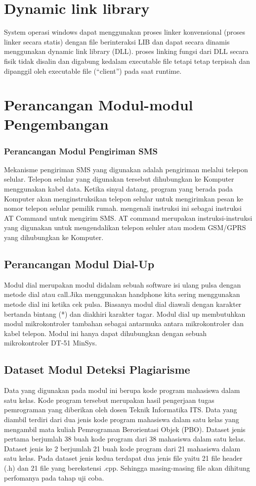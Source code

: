 \section{Dynamic link library}
System operasi windows dapat menggunakan proses linker konvensional (proses linker secara statis) dengan file berinteraksi LIB dan dapat secara dinamis menggunakan dynamic link library (DLL).
proses linking fungsi dari DLL secara fisik tidak disalin dan digabung kedalam executable file tetapi tetap terpisah dan dipanggil oleh executable file (“client”) pada saat runtime.

\section{Perancangan Modul-modul Pengembangan}
\subsubsection{Perancangan Modul Pengiriman SMS}
Mekanisme pengiriman SMS yang digunakan adalah pengiriman melalui telepon selular. Telepon selular yang digunakan tersebut dihubungkan ke Komputer menggunakan kabel data. Ketika sinyal datang, program yang berada pada Komputer akan menginstruksikan telepon selular untuk mengirimkan pesan ke nomor telepon selular pemilik rumah.
mengenali instruksi ini sebagai instruksi AT Command untuk mengirim SMS. AT command merupakan instruksi-instruksi yang digunakan untuk mengendalikan telepon seluler atau modem GSM/GPRS yang dihubungkan ke Komputer.
\subsection{Perancangan Modul Dial-Up}
Modul dial merupakan modul didalam sebuah software isi ulang pulsa dengan metode dial atau call.Jika menggunakan handphone kita sering menggunakan metode dial ini ketika cek pulsa. Biasanya modul dial diawali dengan karakter bertanda bintang (*) 
dan diakhiri karakter tagar. Modul dial up membutuhkan modul mikrokontroler tambahan 
sebagai antarmuka antara mikrokontroler dan kabel telepon. Modul ini hanya dapat dihubungkan dengan 
sebuah mikrokontroler DT-51 MinSys.
\subsection{Dataset Modul Deteksi Plagiarisme}
Data yang digunakan pada modul ini berupa kode program mahasiswa dalam satu kelas. Kode program tersebut merupakan hasil pengerjaan tugas pemrograman yang diberikan oleh dosen Teknik Informatika ITS. Data yang diambil terdiri dari dua jenis kode program mahasiswa dalam satu kelas yang mengambil mata kuliah Pemrograman Berorientasi Objek (PBO). Dataset jenis pertama berjumlah 38 buah kode program dari 38 mahasiswa dalam satu kelas. Dataset jenis ke 2 berjumlah 21 buah kode program dari 21 mahasiswa dalam satu kelas. Pada dataset jenis kedua terdapat dua jenis file yaitu 21 file header (.h) dan 21 file yang berekstensi .cpp. Sehingga masing-masing file akan dihitung perfomanya pada tahap uji coba.
